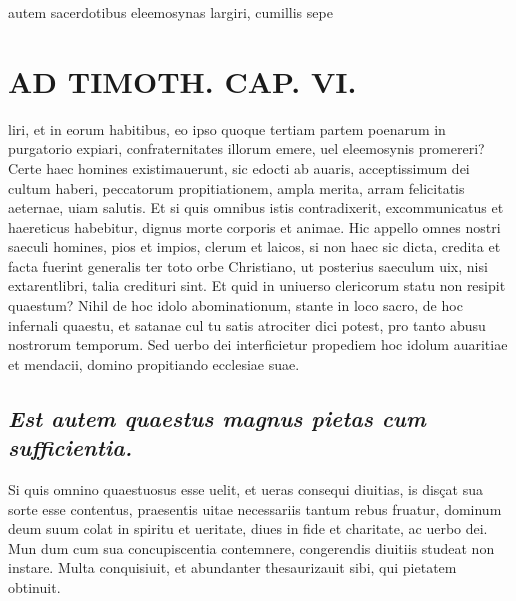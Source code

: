 \documentclass{article}
\begin{document}
\begin{pages}
autem sacerdotibus eleemosynas largiri, cumillis sepe\pend
\section*{AD TIMOTH. CAP. VI. }
\marginpar{[ p.533 ]}\pstart liri, et in eorum habitibus, eo ipso quoque tertiam partem poenarum in purgatorio expiari, confraternitates illorum emere, uel eleemosynis promereri? Certe haec homines existimauerunt, sic edocti ab auaris, acceptissimum dei cultum haberi, peccatorum propitiationem, ampla merita, arram felicitatis aeternae, uiam salutis. Et si quis omnibus istis contradixerit, excommunicatus et haereticus habebitur, dignus morte corporis et animae. Hic appello omnes nostri saeculi homines, pios et impios, clerum et laicos, si non haec sic dicta, credita et facta fuerint generalis ter toto orbe Christiano, ut posterius saeculum uix, nisi extarentlibri, talia credituri sint. Et quid in uniuerso clericorum statu non resipit quaestum? Nihil de hoc idolo abominationum, stante in loco sacro, de hoc infernali quaestu, et satanae cul tu satis atrociter dici potest, pro tanto abusu nostrorum temporum. Sed uerbo dei interficietur propediem hoc idolum auaritiae et mendacii, domino propitiando ecclesiae suae.  \pend
{}
{}
\subsection*{\textit{Est autem quaestus magnus pietas cum sufficientia. }}\pstart Si quis omnino quaestuosus esse uelit, et ueras consequi diuitias, is disçat sua sorte esse contentus, praesentis uitae necessariis tantum rebus fruatur, dominum deum suum colat in spiritu et ueritate, diues in fide et charitate, ac uerbo dei. Mun dum cum sua concupiscentia contemnere, congerendis diuitiis studeat non instare. Multa conquisiuit, et abundanter thesaurizauit sibi, qui pietatem obtinuit.  \pend
{}
{}

\end{pages}
\end{document}
